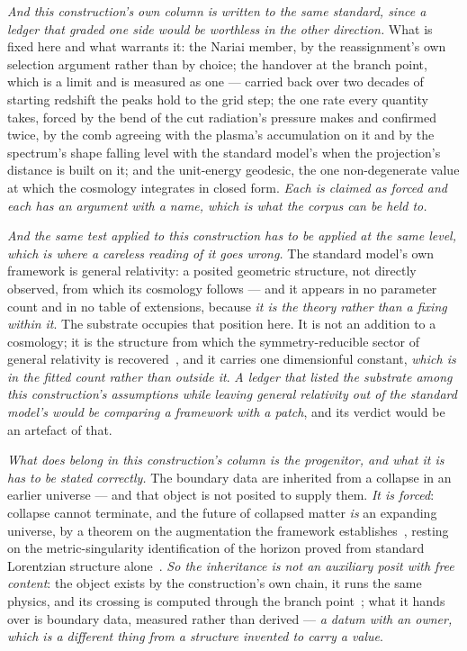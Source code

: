 \documentclass[11pt,a4paper]{article}
\theoremstyle{plain}
\theoremstyle{definition}
\begin{document}
\emph{And this construction's own column is written to the same standard, since a ledger that graded one side
would be worthless in the other direction.} What is fixed here and what warrants it: the Nariai member, by the
reassignment's own selection argument rather than by choice; the handover at the branch point, which is a
limit and is measured as one --- carried back over two decades of starting redshift the peaks hold to the grid
step; the one rate every quantity takes, forced by the bend of the cut radiation's pressure makes and confirmed
twice, by the comb agreeing with the plasma's accumulation on it and by the spectrum's shape falling level with
the standard model's when the projection's distance is built on it; and the unit-energy geodesic, the one non-degenerate value
at which the cosmology integrates in closed form. \emph{Each is claimed as forced and each has an argument
with a name, which is what the corpus can be held to.}

\emph{And the same test applied to this construction has to be applied at the same level, which is where a
careless reading of it goes wrong.} The standard model's own framework is general relativity: a posited
geometric structure, not directly observed, from which its cosmology follows --- and it appears in no
parameter count and in no table of extensions, because \emph{it is the theory rather than a fixing within
it}. The substrate occupies that position here. It is not an addition to a cosmology; it is the structure from
which the symmetry-reducible sector of general relativity is recovered~\cite{JanzenRange}, and it carries one
dimensionful constant, \emph{which is in the fitted count rather than outside it}. \emph{A ledger that listed
the substrate among this construction's assumptions while leaving general relativity out of the standard
model's would be comparing a framework with a patch}, and its verdict would be an artefact of that.

\emph{What does belong in this construction's column is the progenitor, and what it is has to be stated
correctly.} The boundary data are inherited from a collapse in an earlier universe --- and that object is not
posited to supply them. \emph{It is forced}: collapse cannot terminate, and the future of collapsed matter
\emph{is} an expanding universe, by a theorem on the augmentation the framework
establishes~\cite{JanzenCRframework}, resting on the metric-singularity identification of the horizon proved
from standard Lorentzian structure alone~\cite{JanzenBHcausality}. \emph{So the inheritance is not an
auxiliary posit with free content}: the object exists by the construction's own chain, it runs the same
physics, and its crossing is computed through the branch point~\cite{JanzenCosmogenesis}; what it hands over
is boundary data, measured rather than derived --- \emph{a datum with an owner, which is a different thing
from a structure invented to carry a value}.
\end{document}
